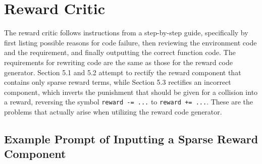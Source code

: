 \documentclass{article}
\begin{document}
\section{Reward Critic} 

The reward critic follows instructions from a step-by-step guide, specifically by first listing possible reasons for code failure, then reviewing the environment code and the requirement, and finally outputting the correct function code. The requirements for rewriting code are the same as those for the reward code generator. Section 5.1 and 5.2 attempt to rectify the reward component that contains only sparse reward terms, while Section 5.3 rectifies an incorrect component, which inverts the punishment that should be given for a collision into a reward, reversing the symbol \verb|reward -= ...| to \verb|reward += ...|. These are the problems that actually arise when utilizing the reward code generator.

\subsection{Example Prompt of Inputting a Sparse Reward Component}
\end{document}
